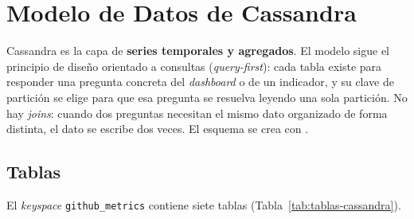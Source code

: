 \section{Modelo de Datos de Cassandra}
\label{sec:cassandra}

Cassandra es la capa de \textbf{series temporales y agregados}. El modelo sigue el principio de diseño orientado a consultas (\textit{query-first}): cada tabla existe para responder una pregunta concreta del \textit{dashboard} o de un indicador, y su clave de partición se elige para que esa pregunta se resuelva leyendo una sola partición. No hay \textit{joins}: cuando dos preguntas necesitan el mismo dato organizado de forma distinta, el dato se escribe dos veces. El esquema se crea con .

\subsection{Tablas}

El \textit{keyspace} \texttt{github\_metrics} contiene siete tablas (Tabla~\ref{tab:tablas-cassandra}).

